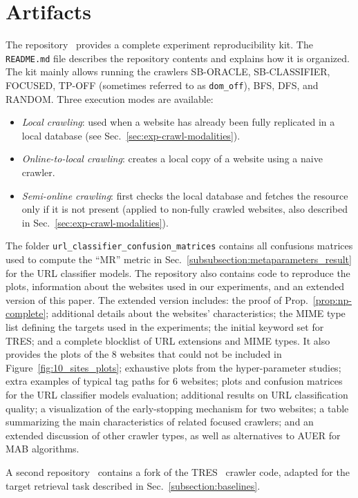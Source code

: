 \section*{Artifacts}

The repository~\cite{github_repository} provides a complete experiment reproducibility kit. The \texttt{README.md} file describes the repository contents and explains how it is organized. The kit mainly allows running the crawlers \textsf{\small SB-ORACLE}, \textsf{\small SB-CLASSIFIER}, \textsf{\small FOCUSED}, \textsf{\small TP-OFF} (sometimes referred to as \verb|dom_off|), \textsf{\small BFS}, \textsf{\small DFS}, and \textsf{\small RANDOM}. Three execution modes are available:
\begin{itemize}
  \item \emph{Local crawling}: used when a website has already been fully replicated in a local database (see Sec.~\ref{sec:exp-crawl-modalities}).
  \item \emph{Online-to-local crawling}: creates a local copy of a website using a naive crawler.
  \item \emph{Semi-online crawling}: first checks the local database and fetches the resource only if it is not present (applied to non-fully crawled websites, also described in Sec.~\ref{sec:exp-crawl-modalities}).
\end{itemize}

The folder \texttt{url\_classifier\_confusion\_matrices} contains all confusions matrices used to compute the ``MR'' metric in Sec.~\ref{subsubsection:metaparameters_result} for the URL classifier models.
The repository also contains code to reproduce the plots, information about the websites used in our experiments, and an extended version of this paper. The extended version includes: the proof of Prop.~\ref{prop:np-complete}; additional details about the websites' characteristics; the MIME type list defining the targets used in the experiments; the initial keyword set for \textsf{\small TRES}; and a complete blocklist of URL extensions and MIME types. It also provides the plots of the 8 websites that could not be included in Figure~\ref{fig:10_sites_plots}; exhaustive plots from the hyper-parameter studies; extra examples of typical tag paths for 6 websites; plots and confusion matrices for the URL classifier models evaluation; additional results on URL classification quality; a visualization of the early-stopping mechanism for two websites; a table summarizing the main characteristics of related focused crawlers; and an extended discussion of other crawler types, as well as alternatives to AUER for MAB algorithms.

A second repository~\cite{tres_modified_repository} contains a fork of the \textsf{\small TRES}~\cite{kontogiannis2022tree} crawler code, adapted for the target retrieval task described in Sec.~\ref{subsection:baselines}. 